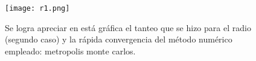\documentclass{article}
\begin{document}
\begin{figure}[H]
\centering
\texttt{[image: r1.png]}
\caption{Se logra apreciar en está gráfica el tanteo que se hizo para el radio (segundo caso) y la rápida convergencia del método numérico empleado: metropolis monte carlos.}
\label{r1}
\end{figure}







\end{document}
